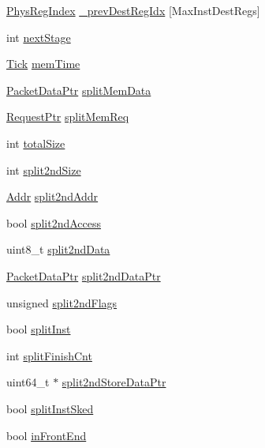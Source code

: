 \begin{DoxyCompactItemize}
\item 
\hyperlink{classInOrderDynInst_a5ec29599c4bc29a3054c451674969e7b}{PhysRegIndex} \hyperlink{classInOrderDynInst_a11e21e74ba2438f42d888b1e80d6de27}{\_\-prevDestRegIdx} \mbox{[}MaxInstDestRegs\mbox{]}
\item 
int \hyperlink{classInOrderDynInst_a73684821fd51938d851381ec91349774}{nextStage}
\item 
\hyperlink{base_2types_8hh_a5c8ed81b7d238c9083e1037ba6d61643}{Tick} \hyperlink{classInOrderDynInst_aaab230be315fbb99b9c86db93dd06519}{memTime}
\item 
\hyperlink{packet_8hh_ae85a9de970f801a77a1ad88ee2b39ea2}{PacketDataPtr} \hyperlink{classInOrderDynInst_a3974fb27b5e46c2f3f3e7f1a61581fe5}{splitMemData}
\item 
\hyperlink{classRequest}{RequestPtr} \hyperlink{classInOrderDynInst_ae38d52dfdfc8e28012f2a36e4a8833a0}{splitMemReq}
\item 
int \hyperlink{classInOrderDynInst_a645e08725d4990fa97be7b032784866c}{totalSize}
\item 
int \hyperlink{classInOrderDynInst_a4d1742389cca9d215d9254a773bcb95e}{split2ndSize}
\item 
\hyperlink{base_2types_8hh_af1bb03d6a4ee096394a6749f0a169232}{Addr} \hyperlink{classInOrderDynInst_a0806e99bb6acc422fecdc362ab52e0fb}{split2ndAddr}
\item 
bool \hyperlink{classInOrderDynInst_a69bff60f1682c6b24a1e023449dc8599}{split2ndAccess}
\item 
uint8\_\-t \hyperlink{classInOrderDynInst_a67e05388daad2587748ac0be821aa177}{split2ndData}
\item 
\hyperlink{packet_8hh_ae85a9de970f801a77a1ad88ee2b39ea2}{PacketDataPtr} \hyperlink{classInOrderDynInst_ad578ac3267a002a2295bf404d592d230}{split2ndDataPtr}
\item 
unsigned \hyperlink{classInOrderDynInst_a5d4cde6a49e8b06c4a287826a2a613ca}{split2ndFlags}
\item 
bool \hyperlink{classInOrderDynInst_a55dbaa3952b31a58d0fa51040f21604f}{splitInst}
\item 
int \hyperlink{classInOrderDynInst_a4b500cc3ae944ca5dfb33172495d1609}{splitFinishCnt}
\item 
uint64\_\-t $\ast$ \hyperlink{classInOrderDynInst_af037e6afcef132350a91b1b05fce6be6}{split2ndStoreDataPtr}
\item 
bool \hyperlink{classInOrderDynInst_ad34f8068ae08b57fe5fadc06a187c1dd}{splitInstSked}
\item 
bool \hyperlink{classInOrderDynInst_a45ed792dccd6209b351f17b77d3e05bc}{inFrontEnd}

\end{DoxyCompactItemize}
